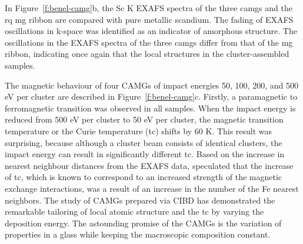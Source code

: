 In Figure~\ref{f:benel-camg}b, the Sc K EXAFS spectra of the three \gls{camg}s and the \gls{rq} \gls{mg} ribbon are compared with pure metallic scandium. The fading of EXAFS oscillations in k-space was identified as an indicator of amorphous structure. The oscillations in the EXAFS spectra of the three \gls{camg}s differ from that of the \gls{mg} ribbon, indicating once again that the local structures in the cluster-assembled samples. \par

The magnetic behaviour of four \fs CAMGs of impact energies 50, 100, 200, and 500 eV per cluster are described in Figure~\ref{f:benel-camg}c.  Firstly, a paramagnetic to ferromagnetic transition was observed in all samples. When the impact energy is reduced from 500 eV per cluster to 50 eV per cluster, the magnetic transition temperature or the Curie temperature (\gls{tc}) shifts by 60 K. This result was surprising, because
although a cluster beam consists of identical clusters, the impact energy can result in significantly different \gls{tc}. Based on the increase in nearest neighbour distances from the EXAFS data, \textcite{Benel2019} speculated that the increase of \gls{tc}, which is known to correspond to an increased strength of the magnetic exchange interactions, was a result of an increase in the number of the Fe nearest neighbors. The study of \fs CAMGs prepared via CIBD has demonstrated the remarkable tailoring of local atomic structure and the \gls{tc} by varying the deposition energy. The astounding promise of the CAMGs is the variation of properties in a glass while keeping the macroscopic composition constant.

